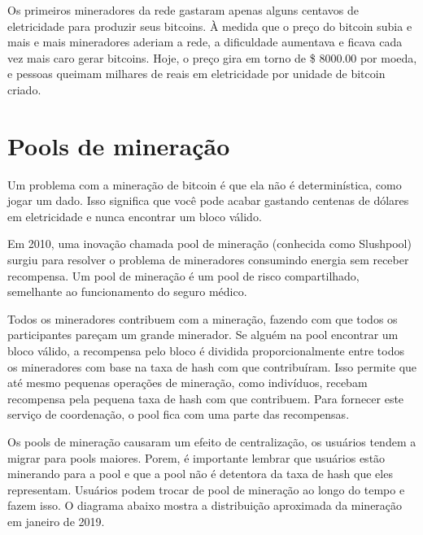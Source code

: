 Os primeiros mineradores da rede gastaram apenas alguns centavos de eletricidade para produzir seus bitcoins. 
À medida que o preço do bitcoin subia e mais e mais mineradores aderiam a rede, a dificuldade aumentava e ficava cada vez mais caro gerar bitcoins. 
Hoje, o preço gira em torno de \$ 8000.00 por moeda, e pessoas queimam milhares de reais em eletricidade por unidade de bitcoin criado.

\section*{Pools de mineração}

Um problema com a mineração de bitcoin é que ela não é determinística, como jogar um dado. 
Isso significa que você pode acabar gastando centenas de dólares em eletricidade e nunca encontrar um bloco válido.

Em 2010, uma inovação chamada pool de mineração (conhecida como Slushpool) surgiu para resolver o problema de mineradores consumindo energia sem receber recompensa.
Um pool de mineração é um pool de risco compartilhado, semelhante ao funcionamento do seguro médico.

Todos os mineradores contribuem com a mineração, fazendo com que todos os participantes pareçam um grande minerador.
Se alguém na pool encontrar um bloco válido, a recompensa pelo bloco é dividida proporcionalmente entre todos os mineradores com base na taxa de hash com que contribuíram.
Isso permite que até mesmo pequenas operações de mineração, como indivíduos, recebam recompensa pela pequena taxa de hash com que contribuem. 
Para fornecer este serviço de coordenação, o pool fica com uma parte das recompensas.




Os pools de mineração causaram um efeito de centralização, os usuários tendem a migrar para pools maiores.
Porem, é importante lembrar que usuários estão minerando para a pool e que a pool não é detentora da taxa de hash que eles representam. 
Usuários podem trocar de pool de mineração ao longo do tempo e fazem isso.
O diagrama abaixo mostra a distribuição aproximada da mineração em janeiro de 2019.

